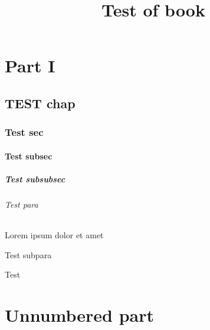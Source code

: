 \documentclass[10pt]{book}
\title{Test of book}
\begin{document}
    \tableofcontents
    
    
    \part{Part I}
    
    \chapter{TEST chap}
    \section{Test sec}
    \subsection{Test subsec}
    \subsubsection{Test subsubsec}
    \paragraph{Test para} Lorem ipsum dolor et amet
    \subparagraph{Test subpara}
    Test
    \part*{Unnumbered part}
\end{document}
